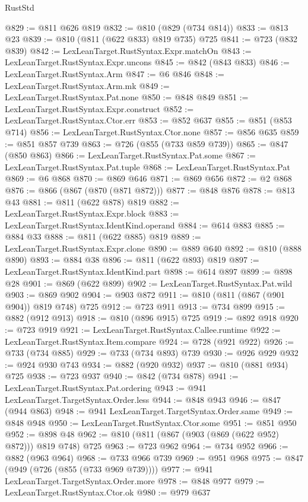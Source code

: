 \begin{lexlean}{RustStd}
\begin{coremodule}
@829 := @811 @626 @819
@832 := @810 (@829 (@734 @814))
@833 := @813 @23
@839 := @810 (@811 (@622 @833) @819 @735) @725
@841 := @723 (@832 @839)
@842 := LexLeanTarget.RustSyntax.Expr.matchOn
@843 := LexLeanTarget.RustSyntax.Expr.uncons
@845 := @842 (@843 @833)
@846 := LexLeanTarget.RustSyntax.Arm
@847 := @6 @846
@848 := LexLeanTarget.RustSyntax.Arm.mk
@849 := LexLeanTarget.RustSyntax.Pat.none
@850 := @848 @849
@851 := LexLeanTarget.RustSyntax.Expr.construct
@852 := LexLeanTarget.RustSyntax.Ctor.err
@853 := @852 @637
@855 := @851 (@853 @714)
@856 := LexLeanTarget.RustSyntax.Ctor.none
@857 := @856 @635
@859 := @851 @857 @739
@863 := @726 (@855 (@733 @859 @739))
@865 := @847 (@850 @863)
@866 := LexLeanTarget.RustSyntax.Pat.some
@867 := LexLeanTarget.RustSyntax.Pat.tuple
@868 := LexLeanTarget.RustSyntax.Pat
@869 := @6 @868
@870 := @869 @646
@871 := @869 @656
@872 := @2 @868
@876 := @866 (@867 (@870 (@871 @872)))
@877 := @848 @876
@878 := @813 @43
@881 := @811 (@622 @878) @819
@882 := LexLeanTarget.RustSyntax.Expr.block
@883 := LexLeanTarget.RustSyntax.IdentKind.operand
@884 := @614 @883
@885 := @884 @33
@888 := @811 (@622 @885) @819
@889 := LexLeanTarget.RustSyntax.Expr.clone
@890 := @889 @640
@892 := @810 (@888 @890)
@893 := @884 @38
@896 := @811 (@622 @893) @819
@897 := LexLeanTarget.RustSyntax.IdentKind.part
@898 := @614 @897
@899 := @898 @28
@901 := @869 (@622 @899)
@902 := LexLeanTarget.RustSyntax.Pat.wild
@903 := @869 @902
@904 := @903 @872
@911 := @810 (@811 (@867 (@901 @904)) @819 @748) @725
@912 := @723 @911
@913 := @734 @899
@915 := @882 (@912 @913)
@918 := @810 (@896 @915) @725
@919 := @892 @918
@920 := @723 @919
@921 := LexLeanTarget.RustSyntax.Callee.runtime
@922 := LexLeanTarget.RustSyntax.Item.compare
@924 := @728 (@921 @922)
@926 := @733 (@734 @885)
@929 := @733 (@734 @893) @739
@930 := @926 @929
@932 := @924 @930 @743
@934 := @882 (@920 @932)
@937 := @810 (@881 @934) @725
@938 := @723 @937
@940 := @842 (@734 @878)
@941 := LexLeanTarget.RustSyntax.Pat.ordering
@943 := @941 LexLeanTarget.TargetSyntax.Order.less
@944 := @848 @943
@946 := @847 (@944 @863)
@948 := @941 LexLeanTarget.TargetSyntax.Order.same
@949 := @848 @948
@950 := LexLeanTarget.RustSyntax.Ctor.some
@951 := @851 @950
@952 := @898 @48
@962 := @810 (@811 (@867 (@903 (@869 (@622 @952) @872))) @819 @748) @725
@963 := @723 @962
@964 := @734 @952
@966 := @882 (@963 @964)
@968 := @733 @966 @739
@969 := @951 @968
@975 := @847 (@949 (@726 (@855 (@733 @969 @739))))
@977 := @941 LexLeanTarget.TargetSyntax.Order.more
@978 := @848 @977
@979 := LexLeanTarget.RustSyntax.Ctor.ok
@980 := @979 @637

\end{coremodule}
\end{lexlean}
